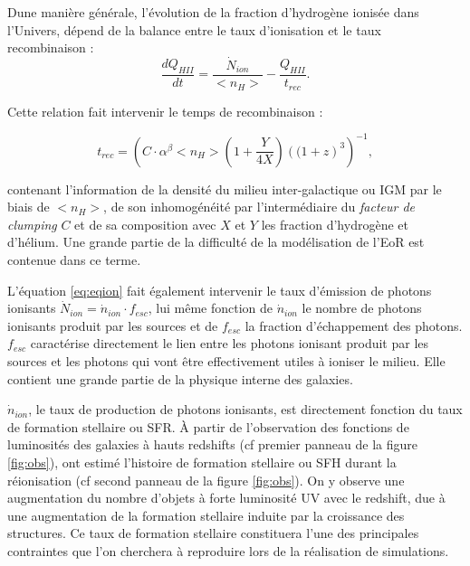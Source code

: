 Dune manière générale, l'évolution de la fraction d'hydrogène ionisée dans l'Univers, dépend de la balance entre le taux d'ionisation et le taux recombinaison \citep{0004-637X-514-2-648, RevModPhys.81.1405} :
\begin{equation}
\frac{dQ_{HII}}{dt} = \frac{\dot{N}_{ion}}{ <n_H>} - \frac{Q_{HII}}{t_{rec}}.
\label{eq:eqion}
\end{equation}

Cette relation fait intervenir le temps de recombinaison :

\begin{equation}
t_{rec} = \left( C\cdot \alpha^\beta <n_H> \left( 1+\frac{Y}{4X}\right) \left((1+z\right)^3  \right)^{-1}, 
\end{equation}

contenant l'information de la densité du milieu inter-galactique ou \ac{IGM} par le biais de $<n_H>$, de son inhomogénéité par l'intermédiaire du \textit{facteur de clumping} $C$ et de sa composition avec $X$ et $Y$ les fraction d'hydrogène et d'hélium.
Une grande partie de la difficulté de la modélisation de l'\ac{EoR} est contenue dans ce terme.

L'équation \ref{eq:eqion} fait également intervenir le taux d'émission de photons ionisants $\dot{N}_{ion}= \dot{n}_{ion} \cdot f_{esc}$, lui même fonction de $\dot{n}_{ion}$ le nombre de photons ionisants produit par les sources et de $f_{esc}$ la fraction d'échappement des photons. 
$f_{esc}$ caractérise directement le lien entre les photons ionisant produit par les sources et les photons qui vont être effectivement utiles à ioniser le milieu.
Elle contient une grande partie de la physique interne des galaxies.

$\dot{n}_{ion}$, le taux de production de photons ionisants, est directement fonction du taux de formation stellaire ou \ac{SFR}.
À partir de l'observation des fonctions de luminosités des galaxies à hauts redshifts (cf premier panneau de la figure \ref{fig:obs}), \cite{bouwens_reionization_2015} ont estimé l'histoire de formation stellaire ou \ac{SFH} durant la réionisation (cf second panneau de la figure \ref{fig:obs}).
On y observe une augmentation du nombre d'objets à forte luminosité UV avec le redshift, due à une augmentation de la formation stellaire induite par la croissance des structures.
Ce taux de formation stellaire constituera l'une des principales contraintes que l'on cherchera à reproduire lors de la réalisation de simulations.





